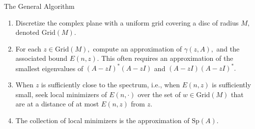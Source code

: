 \documentclass[aspectratio=169]{beamer}
\begin{document}
\begin{frame}{The General Algorithm}

\begin{enumerate}
    \item Discretize the complex plane with a uniform grid covering a disc of radius $M,$ denoted $\text{Grid}(M).$
    \vspace{1em}
    \item For each $z \in \text{Grid}(M),$ compute an approximation of $\gamma(z, A),$ and the associated bound $ E(n, z).$ This often requires an approximation of the smallest eigenvalues of $(A-zI)^*(A-zI)$ and $(A-zI)(A-zI)^*.$
    \vspace{1em}
    \item When $z$ is sufficiently close to the spectrum, i.e., when $E(n, z)$ is sufficiently small, seek local minimizers of $E(n, \cdot)$ over the set of $w \in \text{Grid}(M)$ that are at a distance of at most $E(n, z)$ from $z.$
    \vspace{1em}
    \item The collection of local minimizers is the approximation of $\text{Sp}(A).$
\end{enumerate}


\end{frame}
\end{document}
